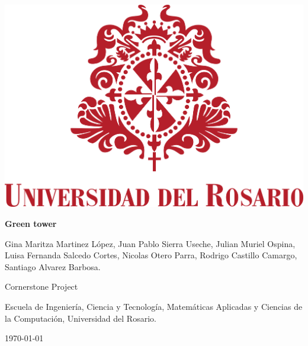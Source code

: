 \thispagestyle{plain}
\hfill
\begin{minipage}{0.17\textwidth}
    \includegraphics[width=\textwidth]{figuras/ur.png} %
\end{minipage}
\hspace{25pt}
\begin{minipage}{0.75\textwidth}

    {\color{G} \Large{\textbf{Green tower}}} %
    \vspace{4mm}

    \large{Gina Maritza Martinez López, Juan Pablo Sierra Useche, Julian Muriel Ospina, Luisa Fernanda Salcedo Cortes, Nicolas Otero Parra, Rodrigo Castillo Camargo, Santiago Alvarez Barbosa.}
    \vspace{2mm}

    Cornerstone Project

    Escuela de Ingeniería, Ciencia y Tecnología, Matemáticas Aplicadas y Ciencias de la Computación, Universidad del Rosario.
    \vspace{1mm}

    \today %

\end{minipage}
